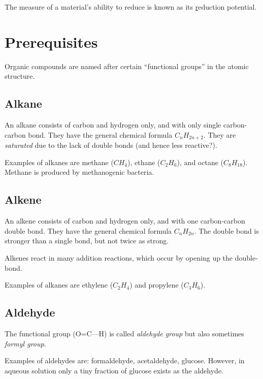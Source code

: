 \documentclass{article}
\begin{document}
The measure of a material's ability to reduce is known as its
\href{https://en.wikipedia.org/wiki/Reduction_potential} reduction potential.



\pagebreak
\section{Prerequisites}\label{sec_prerequisites}

Organic compounds are named after certain ``functional groups'' in the atomic structure.

\subsection{Alkane}

An alkane consists of carbon and hydrogen only, and with only single carbon-carbon bond.
They have the general chemical formula $C_{n}H_{2n+2}$. They are {\em saturated\/}
due to the lack of double bonds (and hence less reactive?).

Examples of alkanes are methane ($CH_4$), ethane ($C_2H_6$), and octane ($C_{8}H_{18}$).
Methane is produced by methanogenic bacteria.

\subsection{Alkene}

An alkene consists of carbon and hydrogen only, and with one carbon-carbon double bond.
They have the general chemical formula $C_{n}H_{2n}$. The double bond is stronger than
a single bond, but not twice as strong.

Alkenes react in many addition reactions, which occur by opening up the double-bond.

Examples of alkanes are ethylene ($C_2H_4$) and propylene ($C_3H_6$).

\subsection{Aldehyde}


The functional group (O=C---H) is called {\em aldehyde group\/} but also sometimes {\em
formyl group}.

Examples of aldehydes are: formaldehyde, acetaldehyde, glucose. However, in aqueous
solution only a tiny fraction of glucose exists as the aldehyde.
\end{document}
